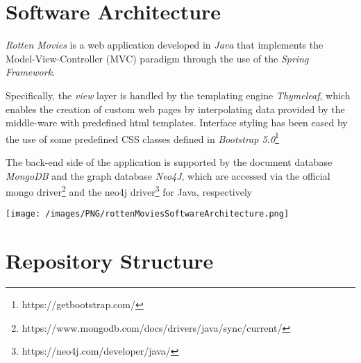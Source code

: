 


\chapter{Software Architecture}
\emph{Rotten Movies} is a web application developed in \emph{Java} that implements the Model-View-Controller (MVC) paradigm through
the use of the \emph{Spring Framework}. 

Specifically, the \emph{view} layer is handled by the templating engine \emph{Thymeleaf}, 
which enables the creation of custom web pages by interpolating data provided by the middle-ware with predefined html templates.
Interface styling has been eased by the use of some predefined CSS classes defined in \emph{Bootstrap 5.0}\footnote{https://getbootstrap.com/}

The back-end side of the application is supported by the document database \emph{MongoDB} and the graph database \emph{Neo4J}, 
which are accessed via the official mongo driver\footnote{https://www.mongodb.com/docs/drivers/java/sync/current/} and the 
neo4j driver\footnote{https://neo4j.com/developer/java/} for Java, respectively

\hspace{2em}

\texttt{[image: /images/PNG/rottenMoviesSoftwareArchitecture.png]}

\chapter{Repository Structure}


